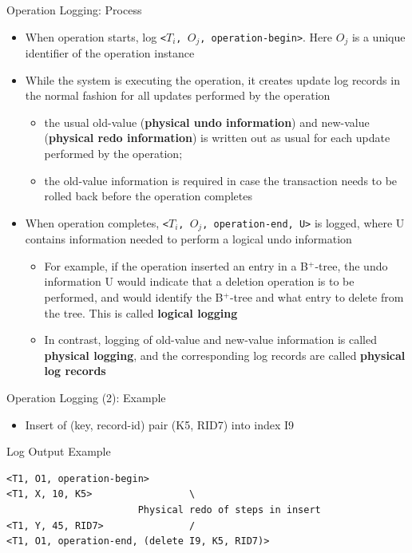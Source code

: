 \documentclass[aspectratio=169, xcolor=dvipsnames]{beamer}
\begin{document}
\begin{frame}{Operation Logging: Process}
    \begin{itemize}[<+->]
        \item When operation starts, log \texttt{<$T_i$, $O_j$, operation-begin>}. Here $O_j$ is a unique identifier of the operation instance
        \item While the system is executing the operation, it creates update log records in the normal fashion for all updates performed by the operation
        \begin{itemize}
            \item[$\triangleright$] the usual old-value (\textbf{physical undo information}) and new-value (\textbf{physical redo information}) is written out as usual for each update performed by the operation;
            \item[$\triangleright$] the old-value information is required in case the transaction needs to be rolled back before the operation completes
        \end{itemize}
        \item When operation completes, \texttt{<$T_i$, $O_j$, operation-end, U>} is logged, where U contains information needed to perform a logical undo information
        \begin{itemize}
            \item[$\triangleright$] For example, if the operation inserted an entry in a B$^+$-tree, the undo information U would indicate that a deletion operation is to be performed, and would identify the B$^+$-tree and what entry to delete from the tree. This is called \textbf{logical logging}
            \item[$\triangleright$] In contrast, logging of old-value and new-value information is called \textbf{physical logging}, and the corresponding log records are called \textbf{physical log records}
        \end{itemize}
    \end{itemize}
\end{frame}

\begin{frame}[fragile]{Operation Logging (2): Example}
    \begin{itemize}[<+->]
        \item Insert of (key, record-id) pair (K5, RID7) into index I9
    \end{itemize}
    \pause
    \begin{exampleblock}{Log Output Example}
        \begin{verbatim}
<T1, O1, operation-begin>
<T1, X, 10, K5>                 \
                       Physical redo of steps in insert
<T1, Y, 45, RID7>               /
<T1, O1, operation-end, (delete I9, K5, RID7)>
        \end{verbatim}
    \end{exampleblock}
\end{frame}
\end{document}

